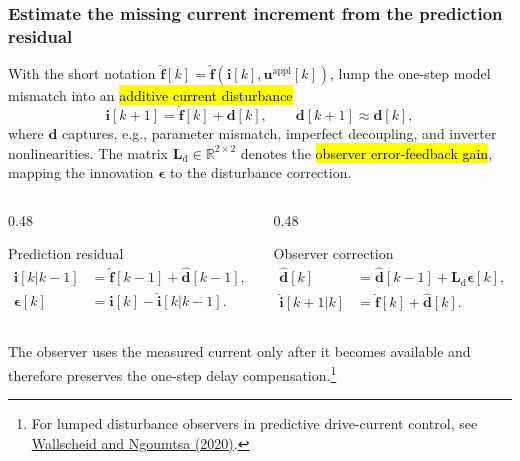 \begin{frame}
    \frametitle{Estimate the missing current increment from the prediction residual}
    With the short notation $\hat{\bm{f}}[k]=\hat{\bm{f}}\!\left(\bm{i}[k],\bm{u}^{\mathrm{appl}}[k]\right)$, lump the one-step model mismatch into an \hl{additive current disturbance}
    \begin{equation}
        \bm{i}[k+1]=\hat{\bm{f}}[k]+\bm{d}[k],
        \qquad \bm{d}[k+1]\approx\bm{d}[k],
        \label{eq:lumped_prediction_disturbance_addendum}
    \end{equation}
    where $\bm{d}$ captures, e.g., parameter mismatch, imperfect decoupling, and inverter nonlinearities. The matrix $\bm{L}_{\mathrm{d}}\in\mathbb{R}^{2\times 2}$ denotes the \hl{observer error-feedback gain}, mapping the innovation $\bm{\epsilon}$ to the disturbance correction.\pause%
    \begin{columns}[c,onlytextwidth]
        \begin{column}{0.48\textwidth}
            \begin{varblock}[\linewidth]{Prediction residual}
                \vspace{-1\baselineskip}\begin{align}
                    \hat{\bm{i}}[k|k-1]
                     & =\hat{\bm{f}}[k-1]+\hat{\bm{d}}[k-1], \\
                    \bm{\epsilon}[k]
                     & =\bm{i}[k]-\hat{\bm{i}}[k|k-1].
                \end{align}
            \end{varblock}
        \end{column}\pause%
        \begin{column}{0.48\textwidth}
            \begin{varblock}[\linewidth]{Observer correction}
                \vspace{-1\baselineskip}\begin{align}
                    \hat{\bm{d}}[k]
                     & =\hat{\bm{d}}[k-1]+\bm{L}_{\mathrm{d}}\bm{\epsilon}[k], \\
                    \hat{\bm{i}}[k+1|k]
                     & =\hat{\bm{f}}[k]+\hat{\bm{d}}[k].
                \end{align}
            \end{varblock}
        \end{column}
    \end{columns}
    \vspace{0.15cm}
    The observer uses the measured current only after it becomes available and therefore preserves the one-step delay compensation.\footnote{For lumped disturbance observers in predictive drive-current control, see \href{https://doi.org/10.1109/TPEL.2020.2992784}{Wallscheid and Ngoumtsa (2020)}.}
\end{frame}

